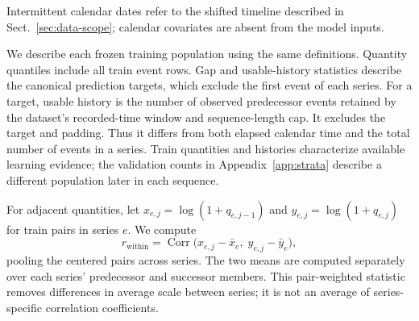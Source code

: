 \documentclass[runningheads]{llncs}
\begin{document}
Intermittent calendar dates refer to the shifted timeline described in
Sect.~\ref{sec:data-scope}; calendar covariates are absent from
the model inputs.

We describe each frozen training population using the same definitions.
Quantity quantiles include all train event rows. Gap and usable-history
statistics describe the canonical prediction targets, which exclude the
first event of each series. For a target, usable history is the number of
observed predecessor events retained by the dataset's recorded-time window
and sequence-length cap. It excludes the target and padding. Thus it differs
from both elapsed calendar time and the total number of events in a series.
Train quantities and histories characterize available learning evidence;
the validation counts in Appendix~\ref{app:strata} describe a different
population later in each sequence.

For adjacent quantities, let $x_{e,j}=\log(1+q_{e,j-1})$ and
$y_{e,j}=\log(1+q_{e,j})$ for train pairs in series $e$. We compute
\begin{equation}
 r_{\mathrm{within}}=\operatorname{Corr}
 \bigl(x_{e,j}-\bar x_e,\;y_{e,j}-\bar y_e\bigr),
 \label{eq:within-correlation}
\end{equation}
pooling the centered pairs across series. The two means are computed
separately over each series' predecessor and successor members. This
pair-weighted statistic removes differences in average scale between series;
it is not an average of series-specific correlation coefficients.
\end{document}

